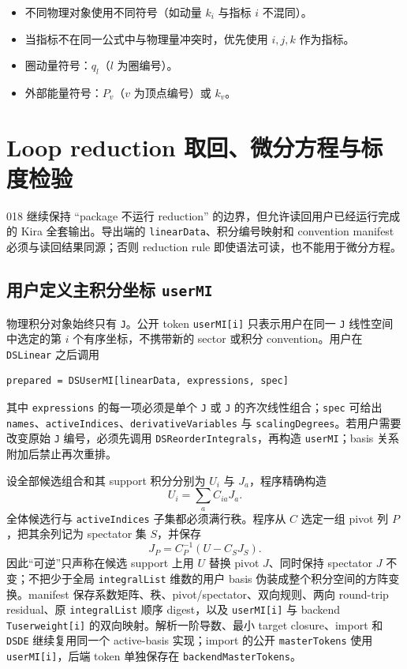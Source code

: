 ﻿\documentclass[a4paper,11pt]{article}
\begin{document}
\begin{itemize}
  \item 不同物理对象使用不同符号（如动量 $k_i$ 与指标 $i$ 不混同）。
  \item 当指标不在同一公式中与物理量冲突时，优先使用 $i, j, k$ 作为指标。
  \item 圈动量符号：$q_l$（$l$ 为圈编号）。
  \item 外部能量符号：$P_v$（$v$ 为顶点编号）或 $k_v$。
\end{itemize}

\section{Loop reduction 取回、微分方程与标度检验}

018 继续保持 ``package 不运行 reduction'' 的边界，但允许读回用户已经运行完成的 Kira 全套输出。导出端的 \texttt{linearData}、积分编号映射和 convention manifest 必须与读回结果同源；否则 reduction rule 即使语法可读，也不能用于微分方程。

\subsection{用户定义主积分坐标 \texttt{userMI}}

物理积分对象始终只有 \texttt{J}。公开 token \texttt{userMI[i]} 只表示用户在同一 \texttt{J} 线性空间中选定的第 $i$ 个有序坐标，不携带新的 sector 或积分 convention。用户在 \texttt{DSLinear} 之后调用
\begin{verbatim}
prepared = DSUserMI[linearData, expressions, spec]
\end{verbatim}
其中 \texttt{expressions} 的每一项必须是单个 \texttt{J} 或 \texttt{J} 的齐次线性组合；\texttt{spec} 可给出 \texttt{names}、\texttt{activeIndices}、\texttt{derivativeVariables} 与 \texttt{scalingDegrees}。若用户需要改变原始 \texttt{J} 编号，必须先调用 \texttt{DSReorderIntegrals}，再构造 \texttt{userMI}；basis 关系附加后禁止再次重排。

设全部候选组合和其 support 积分分别为 $U_i$ 与 $J_a$，程序精确构造
\begin{equation}
 U_i=\sum_a C_{ia}J_a.
\end{equation}
全体候选行与 \texttt{activeIndices} 子集都必须满行秩。程序从 $C$ 选定一组 pivot 列 $P$，把其余列记为 spectator 集 $S$，并保存
\begin{equation}
 J_P=C_P^{-1}\left(U-C_SJ_S\right).
\end{equation}
因此“可逆”只声称在候选 support 上用 $U$ 替换 pivot $J$、同时保持 spectator $J$ 不变；不把少于全局 \texttt{integralList} 维数的用户 basis 伪装成整个积分空间的方阵变换。manifest 保存系数矩阵、秩、pivot/spectator、双向规则、两向 round-trip residual、原 \texttt{integralList} 顺序 digest，以及 \texttt{userMI[i]} 与 backend \texttt{Tuserweight[i]} 的双向映射。解析一阶导数、最小 target closure、import 和 \texttt{DSDE} 继续复用同一个 active-basis 实现；import 的公开 \texttt{masterTokens} 使用 \texttt{userMI[i]}，后端 token 单独保存在 \texttt{backendMasterTokens}。
\end{document}
